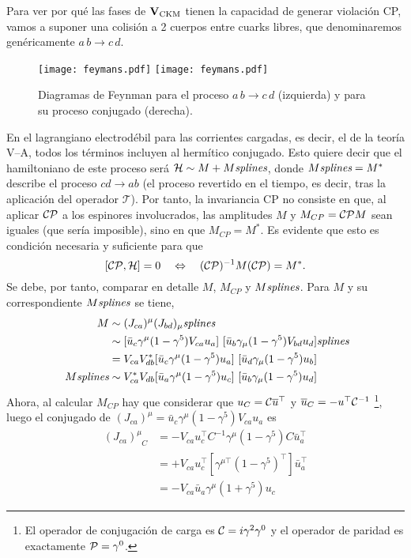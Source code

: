 \begin{subappendices}
Para ver por qué las fases de $\mathbf{V}_{\text{CKM}}$ tienen la capacidad de generar violación CP, vamos a suponer una colisión a 2 cuerpos entre cuarks libres, que denominaremos genéricamente $a\,b \rightarrow c\,d$.
\begin{figure}[H]
\centering
\texttt{[image: feymans.pdf]}
\hspace*{3cm}
\texttt{[image: feymans.pdf]}
\caption{Diagramas de Feynman para el proceso $a\,b \rightarrow c\,d$ (izquierda) y para su proceso conjugado (derecha).}	
\end{figure}
%
En el lagrangiano electrodébil para las corrientes cargadas, es decir, el de la teoría V--A,
todos los términos incluyen al hermítico conjugado. Esto quiere decir que el hamiltoniano de este proceso será $\mathcal{H} \sim M + M\emph{splines}$, donde $M\emph{splines} = M^*$ describe el proceso $cd \rightarrow ab$ (el proceso revertido en el tiempo, es decir, tras la aplicación del operador $\mathcal{T}$). Por tanto, la invariancia CP no consiste en que, al aplicar $\mathcal{CP}$ a los espinores involucrados, las amplitudes $M$ y $M_{CP} = \mathcal{CP} M$ sean iguales (que sería imposible), sino en que $M_{CP} = M^*$. Es evidente que esto es condición necesaria y suficiente para que 
\[[\mathcal{CP},\mathcal{H}] = 0 \quad  \Leftrightarrow \quad  (\mathcal{CP})^{-1} M (\mathcal{CP}) = M^*  .\]
Se debe, por tanto, comparar en detalle $M$, $M_{CP}$ y $M\emph{splines}$. Para $M$ y su correspondiente $M\emph{splines}$ se tiene,
\begin{align*}
M & \sim (J_{ca})^{\mu} (J_{bd})_{\mu}\emph{splines} \\ & \sim [\bar u_c \gamma^{\mu} (1-\gamma^5) V_{ca} u_a ] \,\, [\bar u_b \gamma_{\mu} (1 -\gamma^5) V_{bd} u_d]\emph{splines}	\\ & = V_{ca} V_{db}^* [\bar u_c \gamma^{\mu} (1-\gamma^5)  u_a ] \,\, [\bar u_d \gamma_{\mu} (1 -\gamma^5) u_b] \\ M\emph{splines} & \sim V_{ca}^* V_{db}[\bar u_a \gamma^{\mu} (1-\gamma^5)  u_c ] \,\, [\bar u_b \gamma_{\mu} (1 -\gamma^5) u_d]
\end{align*}
%
Ahora, al calcular $M_{CP}$ hay que considerar que $u_C = \mathcal{C} \overline{u} ^{\top}$ y $\overline{u}_C = - u^{\top} \mathcal{C}^{-1}$ \footnote{El operador de conjugación de carga es $\mathcal{C} = i \gamma^2 \gamma^0$ y el operador  de paridad es exactamente $\mathcal{P} = \gamma^0$.},
luego el conjugado de $ (J_{ca})^{\mu} = \bar u_c \gamma^{\mu} (1-\gamma^5) V_{ca} u_a$ es
\begin{align*}
(J_{ca})_{\phantom{\mu} C}^{\mu} &= -V_{ca} u_c^{\top} C^{-1} \gamma^{\mu} (1-\gamma^5) C \bar{u}_a^{\top}\\ & = + V_{ca} u_c^{\top} [\gamma^{\mu \top} (1- \gamma^5)^{\top}] \bar{u}_a^{\top} \\ &= - V_{ca} \bar{u}_a \gamma^{\mu } (1+ \gamma^5) u_c	

\end{align*}
\end{subappendices}
